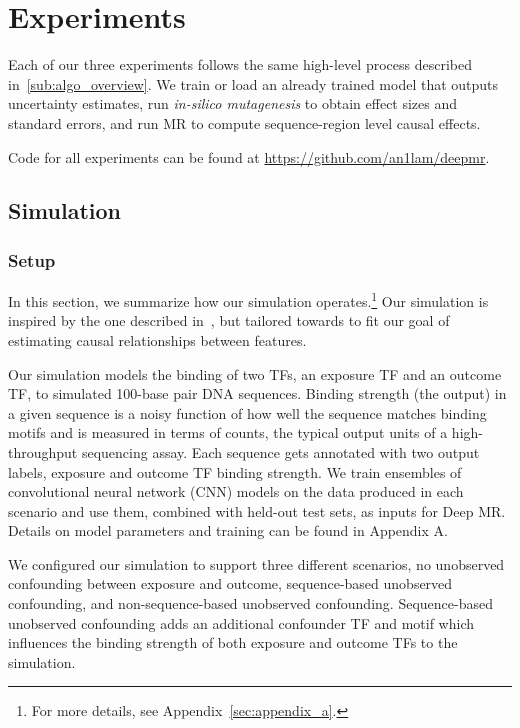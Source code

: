 \section{Experiments}
Each of our three experiments follows the same high-level process described in~\ref{sub:algo_overview}. We train or load an already trained model that outputs uncertainty estimates, run \textit{in-silico mutagenesis} to obtain effect sizes and standard errors, and run MR to compute sequence-region level causal effects.

Code for all experiments can be found at \url{https://github.com/an1lam/deepmr}.

\subsection{Simulation}%
\label{sub:res_simulation}

\subsubsection{Setup}%
\label{ssub:sim_setup}
In this section, we summarize how our simulation operates.\footnote{For more details, see Appendix~\ref{sec:appendix_a}.} Our simulation is inspired by the one described in~\cite{finkelstein2020look}, but tailored towards to fit our goal of estimating causal relationships between features.

Our simulation models the binding of two TFs, an exposure TF and an outcome TF, to simulated 100-base pair DNA sequences. Binding strength (the output) in a given sequence is a noisy function of how well the sequence matches binding motifs and is measured in terms of counts, the typical output units of a high-throughput sequencing assay. Each sequence gets annotated with two output labels, exposure and outcome TF binding strength. We train ensembles of convolutional neural network (CNN) models on the data produced in each scenario and use them, combined with held-out test sets, as inputs for Deep MR. Details on model parameters and training can be found in Appendix A.

We configured our simulation to support three different scenarios, no unobserved confounding between exposure and outcome, sequence-based unobserved confounding, and non-sequence-based unobserved confounding. Sequence-based unobserved confounding adds an additional confounder TF and motif which influences the binding strength of both exposure and outcome TFs to the simulation.

